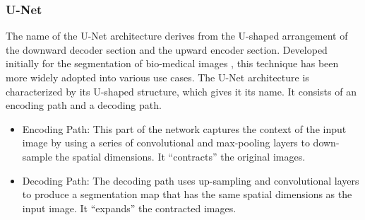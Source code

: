 \documentclass[letterpaper, notitlepage]{report}
\begin{document}
{\subsubsection{U-Net}
The name of the U-Net architecture derives from the U-shaped arrangement of the downward decoder section and the upward encoder section. Developed initially for the segmentation of bio-medical images \parencite{Ronneberger2015-ye}, this technique has been more widely adopted into various use cases. The U-Net architecture is characterized by its U-shaped structure, which gives it its name. It consists of an encoding path and a decoding path.
\begin{itemize}
	\item{Encoding Path: This part of the network captures the context of the input image by using a series of convolutional and max-pooling layers to down-sample the spatial dimensions. It “contracts” the original images.}
	\item{Decoding Path: The decoding path uses up-sampling and convolutional layers to produce a segmentation map that has the same spatial dimensions as the input image. It “expands” the contracted images.}
\end{itemize}

}
\end{document}
